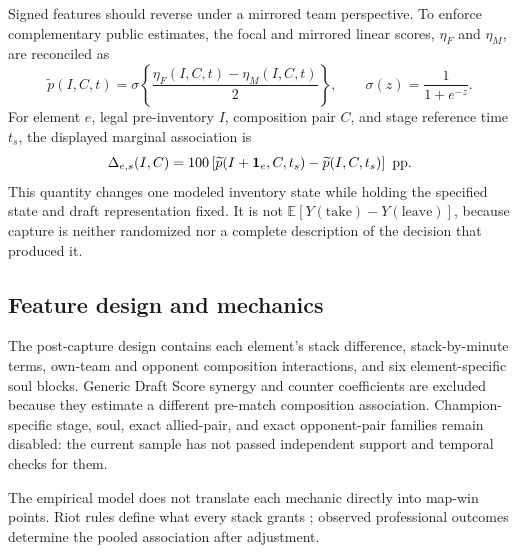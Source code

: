 \documentclass[10pt,letterpaper]{article}
\newcommand{\pp}{\textnormal{ pp}}
\begin{document}
Signed features should reverse under a mirrored team perspective. To enforce complementary public estimates, the focal and mirrored linear scores, $\eta_F$ and $\eta_M$, are reconciled as
\begin{equation}
\widetilde p(I,C,t)
=\sigma\!\left\{\frac{\eta_F(I,C,t)-\eta_M(I,C,t)}{2}\right\},
\qquad
\sigma(z)=\frac{1}{1+e^{-z}}.
\end{equation}
For element $e$, legal pre-inventory $I$, composition pair $C$, and stage reference time $t_s$, the displayed marginal association is
\begin{equation}
\Delta_{e,s}(I,C)
=100\left[
\widetilde p(I+\mathbf 1_e,C,t_s)
-\widetilde p(I,C,t_s)
\right]\pp.
\end{equation}
This quantity changes one modeled inventory state while holding the specified state and draft representation fixed. It is not $\mathbb E[Y( \text{take})-Y(\text{leave})]$, because capture is neither randomized nor a complete description of the decision that produced it.

\subsection{Feature design and mechanics}
The post-capture design contains each element's stack difference, stack-by-minute terms, own-team and opponent composition interactions, and six element-specific soul blocks. Generic Draft Score synergy and counter coefficients are excluded because they estimate a different pre-match composition association. Champion-specific stage, soul, exact allied-pair, and exact opponent-pair families remain disabled: the current sample has not passed independent support and temporal checks for them.

The empirical model does not translate each mechanic directly into map-win points. Riot rules define what every stack grants \cite{riot1320,riot136,riot1222}; observed professional outcomes determine the pooled association after adjustment.
\end{document}
